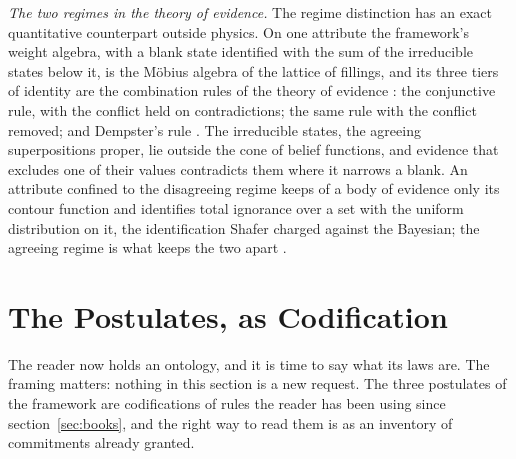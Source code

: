 \documentclass[11pt]{article}
\theoremstyle{definition}
\begin{document}
\textit{The two regimes in the theory of evidence.} The regime distinction has an exact quantitative counterpart outside physics. On one attribute the framework's weight algebra, with a blank state identified with the sum of the irreducible states below it, is the M\"obius algebra of the lattice of fillings, and its three tiers of identity are the combination rules of the theory of evidence \cite{dempster1967, shafer1976}: the conjunctive rule, with the conflict held on contradictions; the same rule with the conflict removed; and Dempster's rule \cite{AethusEvidence}. The irreducible states, the agreeing superpositions proper, lie outside the cone of belief functions, and evidence that excludes one of their values contradicts them where it narrows a blank. An attribute confined to the disagreeing regime keeps of a body of evidence only its contour function and identifies total ignorance over a set with the uniform distribution on it, the identification Shafer charged against the Bayesian; the agreeing regime is what keeps the two apart \cite{AethusEvidence}.



\section{The Postulates, as Codification}\label{sec:postulates}

The reader now holds an ontology, and it is time to say what its laws are. The framing matters: nothing in this section is a new request. The three postulates of the framework are codifications of rules the reader has been using since section~\ref{sec:books}, and the right way to read them is as an inventory of commitments already granted.
\end{document}
